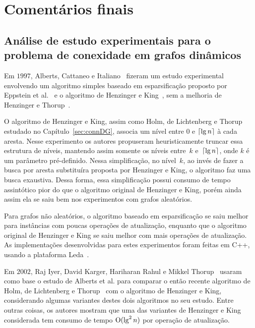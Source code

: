 \chapter{Comentários finais}
\label{sec:conclusao}

\section{Análise de estudo experimentais para o problema de conexidade em grafos dinâmicos}
\label{sec:conclusao:xp}

Em $1997$, Alberts, Cattaneo e Italiano~\cite{EmpiricalStudy1997} fizeram um estudo experimental envolvendo um algoritmo simples baseado em esparsificação proposto por Eppstein et al.~\cite{Eppstein1992SparsificationaTF} e o algoritmo de Henzinger e King~\cite{HenzingerKing}, sem a melhoria de Henzinger e Thorup~\cite{HenzingerThorup}.


O algoritmo de Henzinger e King, assim como Holm, de Lichtenberg e Thorup~\cite{poly_log} estudado no Capítulo~\ref{sec:connDG}, associa um nível entre $0$ e $\lceil{\lg n}\rceil$ à cada aresta.
Nesse experimento os autores propuseram heuristicamente truncar essa estrutura de níveis, mantendo assim somente os níveis entre~$k$ e~$\lceil{\lg n}\rceil$, onde $k$ é um parâmetro pré-definido.
Nessa simplificação, no nível~$k$, ao invés de fazer a busca por aresta substituíra proposta por Henzinger e King, o algoritmo faz uma busca exaustiva. Dessa forma, essa simplificação possui consumo de tempo assintótico pior do que o algoritmo original de Henzinger e King, porém ainda assim ela se saiu bem nos experimentos com grafos aleatórios.

Para grafos não aleatórios, o algoritmo baseado em esparsificação se saiu melhor para instâncias com poucas operações de atualização, enquanto que o algoritmo original de Henzinger e King se saiu melhor com mais operações de atualização.
As implementações desenvolvidas para estes experimentos foram feitas em C++, usando a plataforma Leda~\cite{LEDA}.

Em $2002$, Raj Iyer, David Karger, Hariharan Rahul e Mikkel Thorup~\cite{EmpiricalStudy2002} usaram como base o estudo de Alberts et al. para comparar o então recente algoritmo de Holm, de Lichtenberg e Thorup~\cite{poly_log} com o algoritmo de Henzinger e King, considerando algumas variantes destes dois algoritmos no seu estudo.
Entre outras coisas, os autores mostram que uma das variantes de Henzinger e King considerada tem consumo de tempo $\mathrm{O}(\lg^2 n)$ por operação de atualização.

